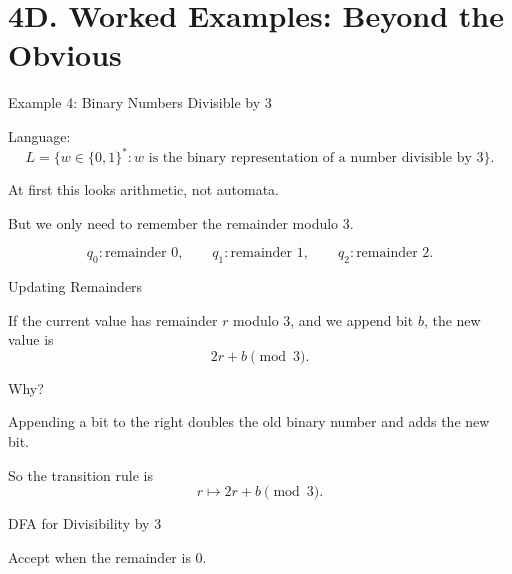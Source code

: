 \documentclass[10pt,aspectratio=169]{beamer}
\begin{document}
\section{4D. Worked Examples: Beyond the Obvious}

\begin{frame}{Example 4: Binary Numbers Divisible by 3}

Language:
\[
L=\{w\in\{0,1\}^*: w\text{ is the binary representation of a number divisible by }3\}.
\]

\pause

At first this looks arithmetic, not automata.

\pause

But we only need to remember the remainder modulo $3$.

\[
q_0: \text{remainder }0,
\qquad
q_1: \text{remainder }1,
\qquad
q_2: \text{remainder }2.
\]

\end{frame}

\begin{frame}{Updating Remainders}

If the current value has remainder $r$ modulo $3$, and we append bit $b$, the new value is
\[
2r+b \pmod 3.
\]

\pause

Why?

Appending a bit to the right doubles the old binary number and adds the new bit.

\pause

So the transition rule is
\[
r\mapsto 2r+b \pmod 3.
\]

\end{frame}

\begin{frame}{DFA for Divisibility by 3}

\begin{center}
\end{center}

\vspace{0.5em}

Accept when the remainder is $0$.

\end{frame}
\end{document}
